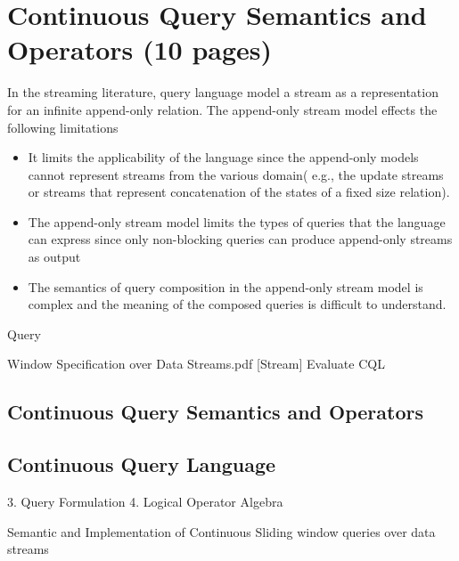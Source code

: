 
\chapter{Continuous Query Semantics and Operators (10 pages)}

\ifpdf
    \graphicspath{{Chapter4/Figs/Raster/}{Chapter4/Figs/PDF/}{Chapter4/Figs/}}
\else
    \graphicspath{{Chapter4/Figs/Vector/}{Chapter4/Figs/}}
\fi

In the streaming literature, query language model a stream as a representation for an infinite append-only relation. The append-only stream model effects the following limitations\citep{Ghanem:2008}
\begin{itemize}
\item It limits the applicability of the language since the append-only models cannot represent streams from the various domain( e.g., the update streams or streams that represent concatenation of the states of a fixed size relation).
\item The append-only stream model limits the types of queries that the language can express since only non-blocking queries can produce append-only streams as output
\item The semantics of query composition in the append-only stream model is complex and the meaning of the composed queries is difficult to understand.
\end{itemize}

Query \citep{Babcok:2002}

Window Specification over Data Streams.pdf
[Stream] Evaluate CQL





\section{Continuous Query Semantics and Operators}


\section{Continuous Query Language}
3. Query Formulation 
4. Logical Operator Algebra

Semantic and Implementation of Continuous Sliding window queries over data streams
